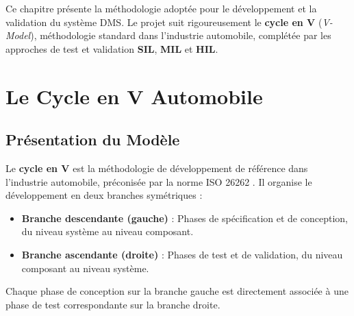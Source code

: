 \documentclass[12pt,a4paper,twoside]{report}
\newcommand{\keyword}[1]{\textbf{\textcolor{stellantisblue}{#1}}}
\begin{document}
Ce chapitre présente la méthodologie adoptée pour le développement et la validation du système DMS. Le projet suit rigoureusement le \keyword{cycle en V} (\textit{V-Model}), méthodologie standard dans l'industrie automobile, complétée par les approches de test et validation \keyword{SIL}, \keyword{MIL} et \keyword{HIL}.

\section{Le Cycle en V Automobile}

\subsection{Présentation du Modèle}

Le \keyword{cycle en V} est la méthodologie de développement de référence dans l'industrie automobile, préconisée par la norme ISO 26262 \cite{iso26262}. Il organise le développement en deux branches symétriques :

\begin{itemize}[leftmargin=2cm]
    \item \textbf{Branche descendante (gauche)} : Phases de spécification et de conception, du niveau système au niveau composant.
    \item \textbf{Branche ascendante (droite)} : Phases de test et de validation, du niveau composant au niveau système.
\end{itemize}

Chaque phase de conception sur la branche gauche est directement associée à une phase de test correspondante sur la branche droite.
\end{document}

